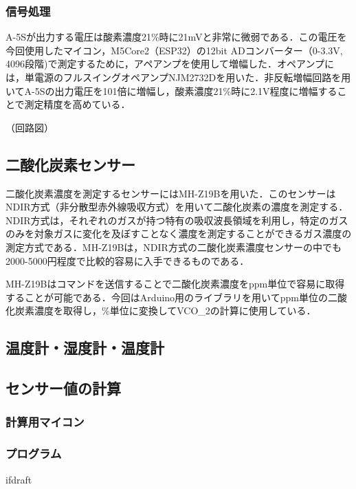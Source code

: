 \subsubsection{信号処理}

A-5Sが出力する電圧は酸素濃度21\%時に21mVと非常に微弱である．この電圧を今回使用したマイコン，M5Core2（ESP32）の12bit ADコンバーター（0-3.3V, 4096段階)で測定するために，アペアンプを使用して増幅した．オペアンプには，単電源のフルスイングオペアンプNJM2732Dを用いた．非反転増幅回路を用いてA-5Sの出力電圧を101倍に増幅し，酸素濃度21\%時に2.1V程度に増幅することで測定精度を高めている．

（回路図）

\subsection{二酸化炭素センサー}

二酸化炭素濃度を測定するセンサーにはMH-Z19Bを用いた．このセンサーはNDIR方式（非分散型赤外線吸収方式）を用いて二酸化炭素の濃度を測定する．NDIR方式は，それぞれのガスが持つ特有の吸収波長領域を利用し，特定のガスのみを対象ガスに変化を及ぼすことなく濃度を測定することができるガス濃度の測定方式である\cite{whats_ndir}．MH-Z19Bは，NDIR方式の二酸化炭素濃度センサーの中でも2000-5000円程度で比較的容易に入手できるものである．

MH-Z19Bはコマンドを送信することで二酸化炭素濃度をppm単位で容易に取得することが可能である．今回はArduino用のライブラリを用いてppm単位の二酸化炭素濃度を取得し，\%単位に変換してVCO_2の計算に使用している．

\subsection{温度計・湿度計・温度計}




\subsection{センサー値の計算}

\subsubsection{計算用マイコン}

\subsubsection{プログラム}

\expandafter\ifx\csname ifdraft\endcsname\relax
  
\fi
